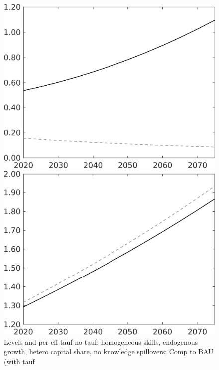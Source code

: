\documentclass[12pt]{article}
\begin{document}
\begin{figure}
	\centering
	\caption{Levels and per eff tauf no tauf: homogeneous skills, endogenous growth, hetero capital share, no knowledge spillovers; Comp to BAU (with tauf}\label{fig:Leveltauf_nsk1_xgr0_noknow_withtaul2}
	
	\begin{minipage}[]{0.32\textwidth}
		\includegraphics[width=1\textwidth]{../../codding_model/own_basedOnFried/optimalPol_010922_revision/figures/all_13Sept22/LevTaufNoTauf_TaulCalib_regime0_LgLf_spillover0_nsk1_xgr0_knspil1_sep1_LFlimit0_emsbase0_countec0_GovRev0_etaa0.79_lgd0.png}
	\end{minipage}	
	\begin{minipage}[]{0.32\textwidth}
		\includegraphics[width=1\textwidth]{../../codding_model/own_basedOnFried/optimalPol_010922_revision/figures/all_13Sept22/LevTaufNoTauf_TaulCalib_regime0_N_spillover0_nsk1_xgr0_knspil1_sep1_LFlimit0_emsbase0_countec0_GovRev0_etaa0.79_lgd0.png}

\end{minipage}
\end{figure}
\end{document}
